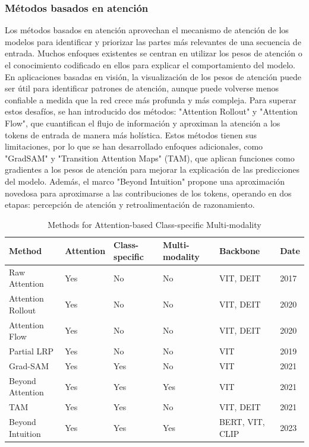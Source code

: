    \subsubsection{ Métodos basados en atención}
  Los métodos basados en atención aprovechan el mecanismo de atención de los modelos para identificar y priorizar las partes más relevantes de una secuencia de entrada. Muchos enfoques existentes se centran en utilizar los pesos de atención o el conocimiento codificado en ellos para explicar el comportamiento del modelo. En aplicaciones basadas en visión, la visualización de los pesos de atención puede ser útil para identificar patrones de atención, aunque puede volverse menos confiable a medida que la red crece más profunda y más compleja. Para superar estos desafíos, se han introducido dos métodos: "Attention Rollout" y "Attention Flow", que cuantifican el flujo de información y aproximan la atención a los tokens de entrada de manera más holística. Estos métodos tienen sus limitaciones, por lo que se han desarrollado enfoques adicionales, como "GradSAM" y "Transition Attention Maps" (TAM), que aplican funciones como gradientes a los pesos de atención para mejorar la explicación de las predicciones del modelo. Además, el marco "Beyond Intuition" propone una aproximación novedosa para aproximarse a las contribuciones de los tokens, operando en dos etapas: percepción de atención y retroalimentación de razonamiento.
  
\begin{table}[htbp]
	\centering
	\caption{Methods for Attention-based Class-specific Multi-modality}
	\label{tab:methods}
	\begin{tabular}{llllll}
		\toprule
		Method & Attention & Class-specific & Multi-modality & Backbone & Date \\
		\midrule
		Raw Attention & Yes & No & No & VIT, DEIT & 2017 \\
		Attention Rollout & Yes & No & No & VIT, DEIT & 2020 \\
		Attention Flow & Yes & No & No & VIT, DEIT & 2020 \\
		Partial LRP & Yes & No & No & VIT & 2019 \\
		Grad-SAM & Yes & Yes & No & VIT & 2021 \\
		Beyond Attention & Yes & Yes & Yes & VIT & 2021 \\
		TAM & Yes & Yes & No & VIT, DEIT & 2021 \\
		Beyond Intuition & Yes & Yes & Yes & BERT, VIT, CLIP & 2023 \\
		\bottomrule
	\end{tabular}
\end{table}
  
